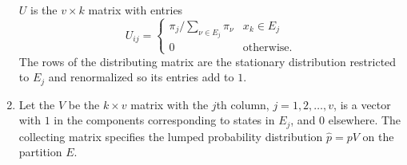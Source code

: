 \documentclass[12pt]{article}
\begin{document}
\begin{enumerate}
        \( U \) is the \( v \times k \) matrix with entries
        \[
            U_{ij} =
            \begin{cases}
                \pi_j/\sum_{\nu \in E_j} \pi_\nu & x_k \in E_j \\
                0 & \text{otherwise}.
            \end{cases}
        \] The rows of the distributing matrix are the stationary
        distribution restricted to \( E_j \) and renormalized so its
        entries add to \( 1 \).
    \item
        Let the %
        \( V \) be the \( k \times v \) matrix with the \( j \)th
        column, \( j = 1, 2, \dots, v \), is a vector with \( 1 \) in
        the components corresponding to states in \( E_j \), and \( 0 \)
        elsewhere.  The collecting matrix specifies the lumped
        probability distribution \( \hat{p} = p V \) on the partition \(
        E \).
\end{enumerate}
\end{document}
